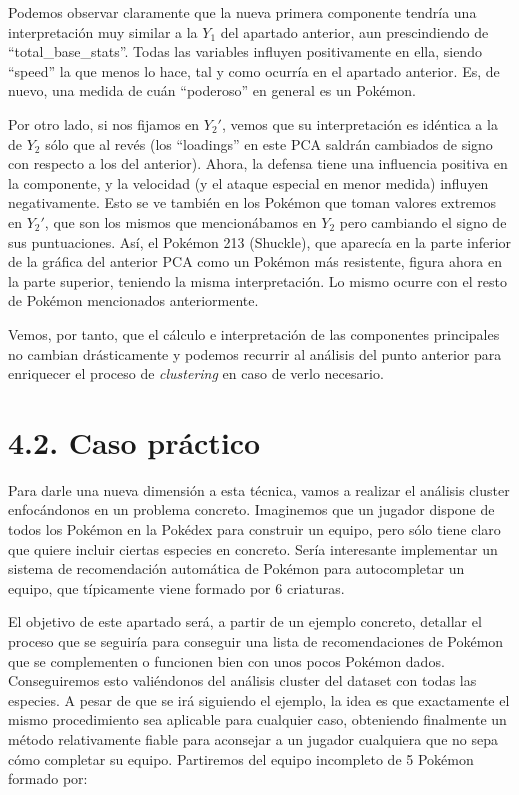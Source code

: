 \documentclass[
  12pt,
]{extreport}
\begin{document}
Podemos observar claramente que la nueva primera componente tendría una
interpretación muy similar a la \(Y_1\) del apartado anterior, aun
prescindiendo de ``total\_base\_stats''. Todas las variables influyen
positivamente en ella, siendo ``speed'' la que menos lo hace, tal y como
ocurría en el apartado anterior. Es, de nuevo, una medida de cuán
``poderoso'' en general es un Pokémon.

Por otro lado, si nos fijamos en \(Y_2'\), vemos que su interpretación
es idéntica a la de \(Y_2\) sólo que al revés (los ``loadings'' en este
PCA saldrán cambiados de signo con respecto a los del anterior). Ahora,
la defensa tiene una influencia positiva en la componente, y la
velocidad (y el ataque especial en menor medida) influyen negativamente.
Esto se ve también en los Pokémon que toman valores extremos en
\(Y_2'\), que son los mismos que mencionábamos en \(Y_2\) pero cambiando
el signo de sus puntuaciones. Así, el Pokémon 213 (Shuckle), que
aparecía en la parte inferior de la gráfica del anterior PCA como un
Pokémon más resistente, figura ahora en la parte superior, teniendo la
misma interpretación. Lo mismo ocurre con el resto de Pokémon
mencionados anteriormente.

Vemos, por tanto, que el cálculo e interpretación de las componentes
principales no cambian drásticamente y podemos recurrir al análisis del
punto anterior para enriquecer el proceso de \emph{clustering} en caso
de verlo necesario.

\section{4.2. Caso práctico}\label{caso-pruxe1ctico}

Para darle una nueva dimensión a esta técnica, vamos a realizar el
análisis cluster enfocándonos en un problema concreto. Imaginemos que un
jugador dispone de todos los Pokémon en la Pokédex para construir un
equipo, pero sólo tiene claro que quiere incluir ciertas especies en
concreto. Sería interesante implementar un sistema de recomendación
automática de Pokémon para autocompletar un equipo, que típicamente
viene formado por 6 criaturas.

El objetivo de este apartado será, a partir de un ejemplo concreto,
detallar el proceso que se seguiría para conseguir una lista de
recomendaciones de Pokémon que se complementen o funcionen bien con unos
pocos Pokémon dados. Conseguiremos esto valiéndonos del análisis cluster
del dataset con todas las especies. A pesar de que se irá siguiendo el
ejemplo, la idea es que exactamente el mismo procedimiento sea aplicable
para cualquier caso, obteniendo finalmente un método relativamente
fiable para aconsejar a un jugador cualquiera que no sepa cómo completar
su equipo. Partiremos del equipo incompleto de 5 Pokémon formado por:
\end{document}
